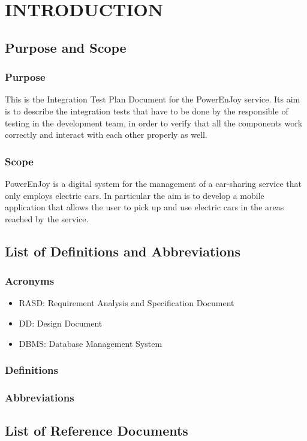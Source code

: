 \section{INTRODUCTION}
\subsection{Purpose and Scope}
\subsubsection{Purpose}

This is the Integration Test Plan Document for the PowerEnJoy service. Its aim is to describe the integration tests that have to be done by the responsible of testing in the development team, in order to verify that all the components work correctly and interact with each other properly as well.
 
\subsubsection{Scope}
PowerEnJoy is a digital system for the management of a car-sharing service that only employs electric cars. In particular the aim is to develop a mobile application that allows the user to pick up and use electric cars in the areas reached by the service.

\subsection{List of Definitions and Abbreviations} 
\subsubsection{Acronyms}
\begin{itemize}
\item RASD: Requirement Analysis and Specification Document
\item DD: Design Document
\item DBMS: Database Management System
\end{itemize}
\subsubsection{Definitions}

\subsubsection{Abbreviations}



\subsection{List of Reference Documents}

